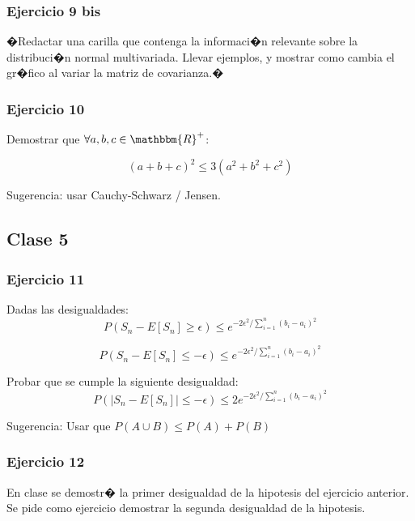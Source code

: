 \documentclass[a4paper,10pt]{article}
\begin{document}
	
	
	

	\subsubsection{Ejercicio 9 bis}
	�Redactar una carilla que contenga la informaci�n relevante sobre la distribuci�n normal multivariada. Llevar ejemplos, y mostrar como cambia el gr�fico al variar la matriz de covarianza.�
		
	\subsubsection{Ejercicio 10}
	
	Demostrar que $\forall a,b,c \in \mathbbm{R}^+$:
	
	$$ (a+b+c)^2 \leq 3(a^2+b^2+c^2)$$
	
	Sugerencia: usar Cauchy-Schwarz / Jensen.
	
	
	\subsection{Clase 5}
	
	\subsubsection{Ejercicio 11}
	
	Dadas las desigualdades:\\
	
	$$P(S_n - E\left[S_n\right] \geq \epsilon ) \leq e^{-2\epsilon^2/ \sum_{i=1}^{n} (b_i-a_i)^2}$$
	
	$$P(S_n - E\left[S_n\right] \leq -\epsilon ) \leq e^{-2\epsilon^2/ \sum_{i=1}^{n} (b_i-a_i)^2}$$
	
	Probar que se cumple la siguiente desigualdad:\\
	
	
	$$P(|S_n - E\left[S_n\right]| \leq -\epsilon ) \leq 2 e^{-2\epsilon^2/ \sum_{i=1}^{n} (b_i-a_i)^2}$$
	
	Sugerencia: Usar que $P(A \cup B) \leq P(A)+P(B)$
	
	
	\subsubsection{Ejercicio 12}
	En clase se demostr� la primer desigualdad de la hipotesis del ejercicio anterior.\\ Se pide como ejercicio demostrar la segunda desigualdad de la hipotesis.
	
\end{document}
